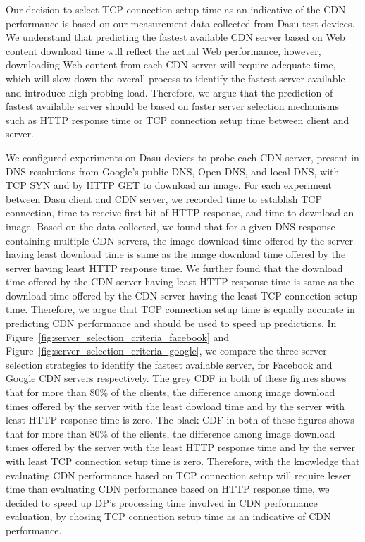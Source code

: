 \documentclass{llncs}
\begin{document}
Our decision to select TCP connection setup time as an indicative of the CDN performance is based on our measurement data collected from Dasu test devices.
We understand that predicting the fastest available CDN server based on Web content download time will reflect the actual Web performance, however, downloading Web content from each CDN server will require adequate time, which will slow down the overall process to identify the fastest server available and introduce high probing load.
Therefore, we argue that the prediction of fastest available server should be based on faster server selection mechanisms such as HTTP response time or TCP connection setup time between client and server.

We configured experiments on Dasu devices to probe each CDN server, present in DNS resolutions from Google's public DNS, Open DNS, and local DNS, with TCP SYN and by HTTP GET to download an image.
For each experiment between Dasu client and CDN server, we recorded time to establish TCP connection, time to receive first bit of HTTP response, and time to download an image.
Based on the data collected, we found that for a given DNS response containing multiple CDN servers, the image download time offered by the server having least download time is same as the image download time offered by the server having least HTTP response time.
We further found that the download time offered by the CDN server having least HTTP response time is same as the download time offered by the CDN server having the least TCP connection setup time.
Therefore, we argue that TCP connection setup time is equally accurate in predicting CDN performance and should be used to speed up predictions. 
In Figure~\ref{fig:server_selection_criteria_facebook} and Figure~\ref{fig:server_selection_criteria_google}, we compare the three server selection strategies to identify the fastest available server, for Facebook and Google CDN servers respectively.
The grey CDF in both of these figures shows that for more than 80\% of the clients, the difference among image download times offered by the server with the least dowload time and by the server with least HTTP response time is zero. 
The black CDF in both of these figures shows that for more than 80\% of the clients, the difference among image download times offered by the server with the least HTTP response time and by the server with least TCP connection setup time is zero. 
Therefore, with the knowledge that evaluating CDN performance based on TCP connection setup will require lesser time than evaluating CDN performance based on HTTP response time, we decided to speed up DP's processing time involved in CDN performance evaluation, by chosing TCP connection setup time as an indicative of CDN performance.
\end{document}
